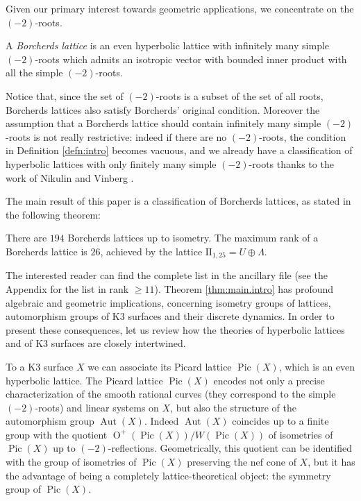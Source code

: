 \documentclass[11pt,letterpaper]{amsart}
\DeclareMathOperator{\Aut}{Aut}
\DeclareMathOperator{\Pic}{Pic}
\DeclareMathOperator{\Or}{O}
\begin{document}
Given our primary interest towards geometric applications, we concentrate on the $(-2)$-roots.
\begin{definition} \label{defn:intro}
 A \emph{Borcherds lattice} is an even hyperbolic lattice with infinitely many simple $(-2)$-roots which admits an isotropic vector with bounded inner product with all the simple $(-2)$-roots. 
\end{definition}
Notice that, since the set of $(-2)$-roots is a subset of the set of all roots, Borcherds lattices also satisfy Borcherds' original condition. Moreover the assumption that a Borcherds lattice should contain infinitely many simple $(-2)$-roots is not really restrictive: indeed if there are no $(-2)$-roots, the condition in Definition \ref{defn:intro} becomes vacuous, and we already have a classification of hyperbolic lattices with only finitely many simple $(-2)$-roots thanks to the work of Nikulin \cite{nikulin.finite.aut.3,nikulin.finite.aut.greater.5} and Vinberg \cite{vinberg.finite.aut.4}.

The main result of this paper is a classification of Borcherds lattices, as stated in the following theorem:

\begin{theorem} \label{thm:main.intro}
There are $194$ Borcherds lattices up to isometry. The maximum rank of a Borcherds lattice is $26$, achieved by the lattice $\mathrm{II}_{1,25}=U\oplus \Lambda$.
\end{theorem}
The interested reader can find the complete list in the ancillary file (see the Appendix for the list in rank $\ge 11$).
Theorem \ref{thm:main.intro} has profound algebraic and geometric implications, concerning isometry groups of lattices, automorphism groups of K3 surfaces and their discrete dynamics. In order to present these consequences, let us review how the theories of hyperbolic lattices and of K3 surfaces are closely intertwined.

To a K3 surface $X$ we can associate its Picard lattice $\Pic(X)$, which is an even hyperbolic lattice. The Picard lattice $\Pic(X)$ encodes not only a precise characterization of the smooth rational curves (they correspond to the simple $(-2)$-roots) and linear systems on $X$, but also the structure of the automorphism group $\Aut(X)$. Indeed $\Aut(X)$ coincides up to a finite group with the quotient $\Or^+(\Pic(X))/W(\Pic(X))$ of isometries of $\Pic(X)$ up to $(-2)$-reflections. Geometrically, this quotient can be identified with the group of isometries of $\Pic(X)$ preserving the nef cone of $X$, but it has the advantage of being a completely lattice-theoretical object: the symmetry group of $\Pic(X)$.
\end{document}
